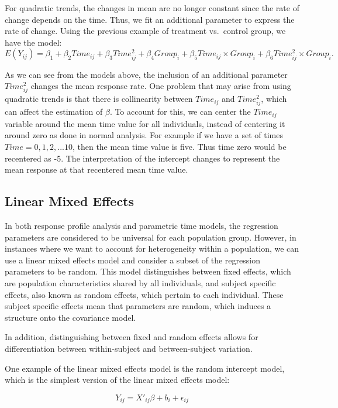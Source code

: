 \documentclass[12pt, twoside]{amherstthesis}
\begin{document}
For quadratic trends, the changes in mean are no longer constant since the rate of change depends on the time. Thus, we fit an additional parameter to express the rate of change.
Using the previous example of treatment vs.~control group, we have the model:
\[E(Y_{ij}) = \beta_1 + \beta_2Time_{ij}+\beta_3Time^2_{ij}+\beta_4Group_i + \beta_5Time_{ij} \times Group_i + \beta_6Time^2_{ij} \times Group_i.\]

As we can see from the models above, the inclusion of an additional parameter \(Time^2_{ij}\) changes the mean response rate. One problem that may arise from using quadratic trends is that there is collinearity between \(Time_{ij}\) and \(Time^2_{ij}\), which can affect the estimation of \(\beta\). To account for this, we can center the \(Time_{ij}\) variable around the mean time value for all individuals, instead of centering it around zero as done in normal analysis. For example if we have a set of times \(Time = {0,1,2,...10}\), then the mean time value is five. Thus time zero would be recentered as -5. The interpretation of the intercept changes to represent the mean response at that recentered mean time value.

\hypertarget{linear-mixed-effects}{%
\subsection{Linear Mixed Effects}\label{linear-mixed-effects}}

In both response profile analysis and parametric time models, the regression parameters are considered to be universal for each population group. However, in instances where we want to account for heterogeneity within a population, we can use a linear mixed effects model and consider a subset of the regression parameters to be random. This model distinguishes between fixed effects, which are population characteristics shared by all individuals, and subject specific effects, also known as random effects, which pertain to each individual. These subject specific effects mean that parameters are random, which induces a structure onto the covariance model.

In addition, distinguishing between fixed and random effects allows for differentiation between within-subject and between-subject variation.

One example of the linear mixed effects model is the random intercept model, which is the simplest version of the linear mixed effects model:

\[Y_{ij} = X'_{ij}\beta + b_i + \epsilon_{ij}\]
\end{document}
